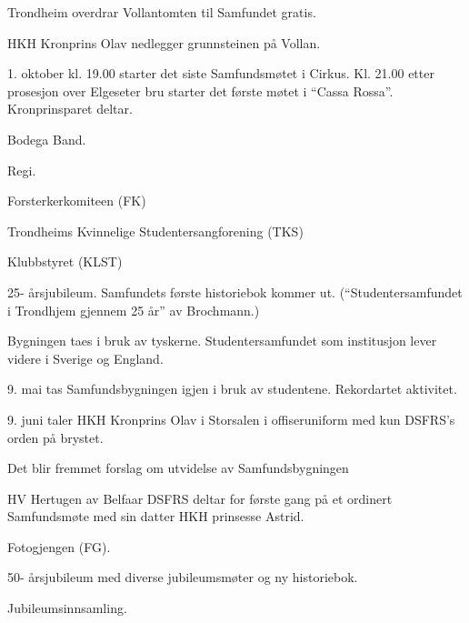 \documentclass[fsbok.tex]{subfiles}
\begin{document}
  \item Trondheim overdrar Vollantomten til Samfundet gratis.
\yearend 

  \item HKH Kronprins Olav nedlegger grunnsteinen på Vollan.
\yearend 

  \item 1. oktober kl. 19.00 starter det siste Samfundsmøtet i Cirkus. Kl. 21.00 etter prosesjon over Elgeseter bru starter
det første møtet i ``Cassa Rossa''. Kronprinsparet deltar.
  \item Bodega Band.
  \item Regi.
\yearend 

  \item Forsterkerkomiteen (FK)
  \item Trondheims Kvinnelige Studentersangforening (TKS)
\yearend 

  \item Klubbstyret (KLST)
\yearend 

\pagebreak
{}
  \item 25- årsjubileum. Samfundets første historiebok kommer ut. (``Studentersamfundet i Trondhjem gjennem 25 år'' av
Brochmann.)
\yearend 

  \item Bygningen taes i bruk av tyskerne. Studentersamfundet som institusjon lever videre i Sverige og England.
\yearend 

  \item 9. mai tas Samfundsbygningen igjen i bruk av studentene. Rekordartet aktivitet.
  \item 9. juni taler HKH Kronprins Olav i Storsalen i offiseruniform med kun DSFRS's orden på brystet.
\yearend 

  \item Det blir fremmet forslag om utvidelse av Samfundsbygningen
\yearend 

  \item HV Hertugen av Belfaar DSFRS deltar for første gang på et ordinert Samfundsmøte med sin datter HKH
prinsesse Astrid.
\yearend 

  \item Fotogjengen (FG).
\yearend 

  \item 50- årsjubileum med diverse jubileumsmøter og ny historiebok.
  \item Jubileumsinnsamling.
\yearend 
\end{document}

